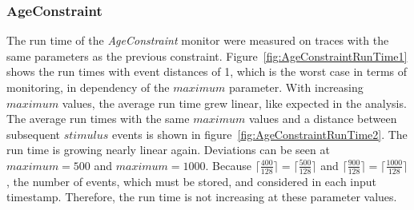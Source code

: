 \subsubsection{AgeConstraint}
The run time of the \textit{AgeConstraint} monitor were measured on traces with the same parameters as the previous constraint. Figure~\ref{fig:AgeConstraintRunTime1} shows the run times with event distances of 1, which is the worst case in terms of monitoring, in dependency of the $maximum$ parameter. With increasing $maximum$ values, the average run time grew linear, like expected in the analysis. The average run times with the same $maximum$ values and a distance between subsequent $stimulus$ events is shown in figure~\ref{fig:AgeConstraintRunTime2}. The run time is growing nearly linear again. Deviations can be seen at $maximum=500$ and $maximum=1000$. Because $\lceil\frac{400}{128}\rceil=\lceil\frac{500}{128}\rceil$ and $\lceil\frac{900}{128}\rceil=\lceil\frac{1000}{128}\rceil$, the number of events, which must be stored, and considered in each input timestamp. Therefore, the run time is not increasing at these parameter values.
